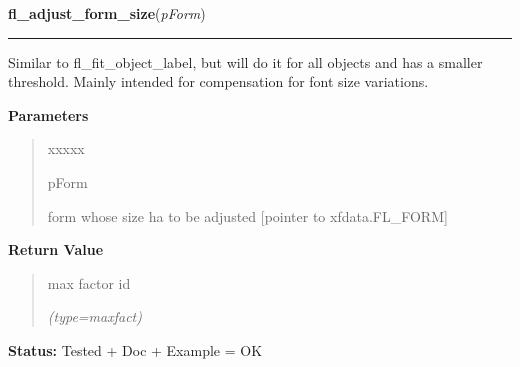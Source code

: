 \hspace{.8\funcindent}\begin{boxedminipage}{\funcwidth}

    \raggedright \textbf{fl\_adjust\_form\_size}(\textit{pForm})

    \vspace{-1.5ex}

    \rule{\textwidth}{0.5\fboxrule}
\setlength{\parskip}{2ex}
    Similar to fl\_fit\_object\_label, but will do it for all objects and 
    has a smaller threshold. Mainly intended for compensation for font size
    variations.

\setlength{\parskip}{1ex}
      \textbf{Parameters}
      \vspace{-1ex}

      \begin{quote}
        \begin{Ventry}{xxxxx}

          \item[pForm]

          form whose size ha to be adjusted [pointer to xfdata.FL\_FORM]

        \end{Ventry}

      \end{quote}

      \textbf{Return Value}
    \vspace{-1ex}

      \begin{quote}
      max factor id

      {\it (type=maxfact)}

      \end{quote}

\textbf{Status:} Tested + Doc + Example = OK



    \end{boxedminipage}

    \label{xformslib:library:fl_form_is_visible}

    \vspace{0.5ex}

